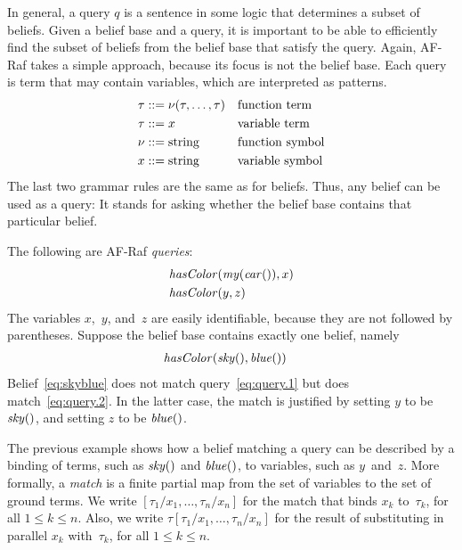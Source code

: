 \documentclass[a4paper,12pt,oneside,fleqn]{book} %
\begin{document}
In general, a query $q$ is a sentence in some logic that determines a
subset of beliefs.  Given a belief base and a query, it is important to be
able to efficiently find the subset of beliefs from the belief base that
satisfy the query.  Again, AF-Raf takes a simple approach, because its
focus is not the belief base.  Each query is term that may contain
variables, which are interpreted as patterns.  \begin{align} \tau &::=
\nu(\tau,\ldots,\tau) && \text{function term} \\ \tau &::= x &&
\text{variable term} \\ \nu  &::= {\rm string} &&\text{function symbol} \\
x &::= {\rm string} && \text{variable symbol} \end{align} The last two
grammar rules are the same as for beliefs.  Thus, any belief can be used as
a query:  It stands for asking whether the belief base contains that
particular belief.

\begin{example} The following are AF-Raf \emph{queries}: \begin{align}
&{\it hasColor}({\it my}({\it car}()), x) \label{eq:query.1} \\ &{\it
hasColor}(y, z) \label{eq:query.2} \end{align} The variables $x$,~$y$,
and~$z$ are easily identifiable, because they are not followed by
parentheses.  Suppose the belief base contains exactly one belief, namely
\begin{align} &{\it hasColor}({\it sky}(), {\it blue}()) \label{eq:skyblue}
\end{align} Belief~\eqref{eq:skyblue} does not match
query~\eqref{eq:query.1} but does match~\eqref{eq:query.2}.  In the latter
case, the match is justified by setting $y$ to be ${\it sky}()$, and
setting $z$ to be ${\it blue}()$.
\end{example}

The previous example shows how a belief matching a query can be described
by a binding of terms, such as ${\it sky}()$ and ${\it blue}()$, to
variables, such as $y$~and~$z$.  More formally, a \emph{match} is a finite
partial map from the set of variables to the set of ground terms.  We write
$[\tau_1/x_1,\ldots,\tau_n/x_n]$ for the match that binds $x_k$
to~$\tau_k$, for all $1\le k\le n$.  Also, we write
$\tau[\tau_1/x_1,\ldots,\tau_n/x_n]$ for the result of substituting in
parallel $x_k$ with~$\tau_k$, for all $1\le k\le n$.
\end{document}
